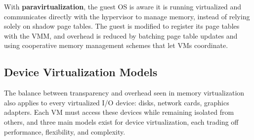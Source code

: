 \smallskip

With \textbf{paravirtualization}, the guest OS is aware it is running virtualized and communicates directly with the hypervisor to manage memory, instead of relying solely on shadow page tables. The guest is modified to register its page tables with the VMM, and overhead is reduced by batching page table updates and using cooperative memory management schemes that let VMs coordinate.

\subsection{Device Virtualization Models} \label{subsec:device_virtualization_models}
 
The balance between transparency and overhead seen in memory virtualization also applies to every virtualized I/O device: disks, network cards, graphics adapters. Each VM must access these devices while remaining isolated from others, and three main models exist for device virtualization, each trading off performance, flexibility, and complexity.

\vspace{-0.5em}

